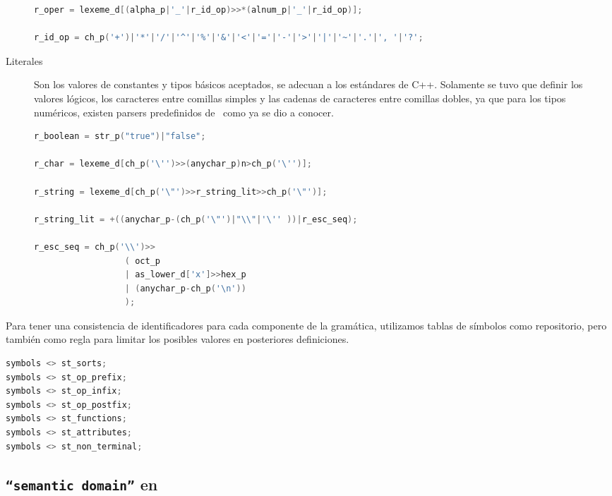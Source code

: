 \begin{description}
\begin{lstlisting}[language=C++, basicstyle=\scriptsize, columns=fullflexible, linewidth=10cm]
r_oper = lexeme_d[(alpha_p|'_'|r_id_op)>>*(alnum_p|'_'|r_id_op)];

r_id_op = ch_p('+')|'*'|'/'|'^'|'%'|'&'|'<'|'='|'-'|'>'|'|'|'~'|'.'|', '|'?';
\end{lstlisting}

\item [Literales] Son los valores de constantes y tipos básicos aceptados, se adecuan a los estándares de C++. Solamente se tuvo que definir los valores lógicos, los caracteres entre comillas simples y las cadenas de caracteres entre comillas dobles, ya que para los tipos numéricos, existen parsers predefinidos de \spirit\ como ya se dio a conocer.

\begin{lstlisting}[language=C++, basicstyle=\scriptsize, columns=fullflexible, linewidth=9cm]
r_boolean = str_p("true")|"false";

r_char = lexeme_d[ch_p('\'')>>(anychar_p)n>ch_p('\'')];

r_string = lexeme_d[ch_p('\"')>>r_string_lit>>ch_p('\"')];

r_string_lit = +((anychar_p-(ch_p('\"')|"\\"|'\'' ))|r_esc_seq);

r_esc_seq = ch_p('\\')>>
                  ( oct_p
                  | as_lower_d['x']>>hex_p
                  | (anychar_p-ch_p('\n'))
                  );
\end{lstlisting}
\end{description}

Para tener una consistencia de identificadores para cada componente de la gramática, utilizamos tablas de símbolos como repositorio, pero también como regla para limitar los posibles valores en posteriores definiciones.

\begin{lstlisting}[language=C++, basicstyle=\scriptsize, columns=fullflexible, linewidth=5cm]
symbols <> st_sorts;
symbols <> st_op_prefix;
symbols <> st_op_infix;
symbols <> st_op_postfix;
symbols <> st_functions;
symbols <> st_attributes;
symbols <> st_non_terminal;
\end{lstlisting}

\subsection{\texttt{``semantic domain''} en \spirit}

